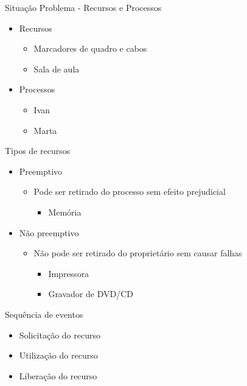 \documentclass[aspectratio=169,
				xcolor=table]{beamer}
\begin{document}
	\begin{frame}{Situação Problema - Recursos e Processos}
		\begin{itemize}
			\item Recursos
			\begin{itemize}
				\item Marcadores de quadro e cabos
				\item Sala de aula
			\end{itemize}
			\vspace{1em}
			\item Processos
			\begin{itemize}
				\item Ivan
				\item Marta
			\end{itemize}
		\end{itemize}			
	\end{frame}	
	
	\begin{frame}{Tipos de recursos}
		\begin{itemize}
			\item Preemptivo
			\begin{itemize}
				\item Pode ser retirado do processo sem efeito prejudicial
				\begin{itemize}
					\item Memória
				\end{itemize}
			\end{itemize}
			\vspace{1em}
			\item Não preemptivo
			\begin{itemize}
				\item Não pode ser retirado do proprietário sem causar falhas
				\begin{itemize}
					\item Impressora
					\item Gravador de DVD/CD
				\end{itemize}
			\end{itemize}
		\end{itemize}
	\end{frame}
	
	\begin{frame}{Sequência de eventos}
		\begin{itemize}
			\item Solicitação do recurso
			\vspace{1em}
			\item Utilização do recurso
			\vspace{1em}
			\item Liberação do recurso
		\end{itemize}
	\end{frame}
	
\end{document}
